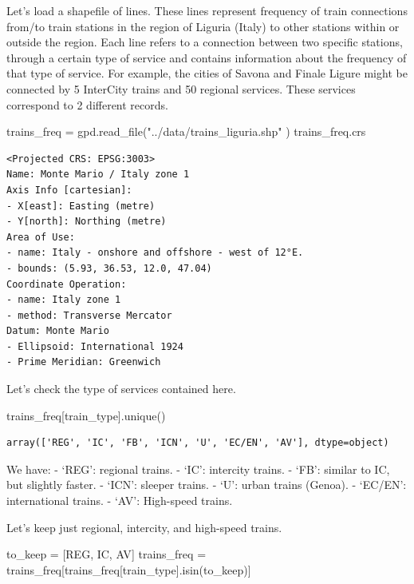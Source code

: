 \documentclass[
  letterpaper,
  DIV=11,
  numbers=noendperiod]{scrreprt}
\newenvironment{Shaded}{\begin{snugshade}}{\end{snugshade}}
\newcommand{\NormalTok}[1]{\textcolor[rgb]{0.00,0.23,0.31}{#1}}
\newcommand{\OperatorTok}[1]{\textcolor[rgb]{0.37,0.37,0.37}{#1}}
\newcommand{\StringTok}[1]{\textcolor[rgb]{0.13,0.47,0.30}{#1}}
\begin{document}
Let's load a shapefile of lines. These lines represent frequency of
train connections from/to train stations in the region of Liguria
(Italy) to other stations within or outside the region. Each line refers
to a connection between two specific stations, through a certain type of
service and contains information about the frequency of that type of
service. For example, the cities of Savona and Finale Ligure might be
connected by 5 InterCity trains and 50 regional services. These services
correspond to 2 different records.

\begin{Shaded}
\begin{Highlighting}[]
\NormalTok{trains\_freq }\OperatorTok{=}\NormalTok{ gpd.read\_file(}\StringTok{"../data/trains\_liguria.shp"}\NormalTok{ )}
\NormalTok{trains\_freq.crs}
\end{Highlighting}
\end{Shaded}

\begin{verbatim}
<Projected CRS: EPSG:3003>
Name: Monte Mario / Italy zone 1
Axis Info [cartesian]:
- X[east]: Easting (metre)
- Y[north]: Northing (metre)
Area of Use:
- name: Italy - onshore and offshore - west of 12°E.
- bounds: (5.93, 36.53, 12.0, 47.04)
Coordinate Operation:
- name: Italy zone 1
- method: Transverse Mercator
Datum: Monte Mario
- Ellipsoid: International 1924
- Prime Meridian: Greenwich
\end{verbatim}

Let's check the type of services contained here.

\begin{Shaded}
\begin{Highlighting}[]
\NormalTok{trains\_freq[}\StringTok{\textquotesingle{}train\_type\textquotesingle{}}\NormalTok{].unique()}
\end{Highlighting}
\end{Shaded}

\begin{verbatim}
array(['REG', 'IC', 'FB', 'ICN', 'U', 'EC/EN', 'AV'], dtype=object)
\end{verbatim}

We have: - `REG': regional trains. - `IC': intercity trains. - `FB':
similar to IC, but slightly faster. - `ICN': sleeper trains. - `U':
urban trains (Genoa). - `EC/EN': international trains. - `AV':
High-speed trains.

Let's keep just regional, intercity, and high-speed trains.

\begin{Shaded}
\begin{Highlighting}[]
\NormalTok{to\_keep }\OperatorTok{=}\NormalTok{ [}\StringTok{\textquotesingle{}REG\textquotesingle{}}\NormalTok{, }\StringTok{\textquotesingle{}IC\textquotesingle{}}\NormalTok{, }\StringTok{\textquotesingle{}AV\textquotesingle{}}\NormalTok{]}
\NormalTok{trains\_freq }\OperatorTok{=}\NormalTok{ trains\_freq[trains\_freq[}\StringTok{\textquotesingle{}train\_type\textquotesingle{}}\NormalTok{].isin(to\_keep)]}
\end{Highlighting}
\end{Shaded}
\end{document}
